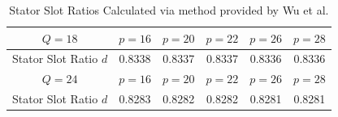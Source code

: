 \documentclass [a4 paper, 11pt, titlepage] {article}
\begin{document}
	\begin{table}[h]
		\begin{center}
			\begin{tabular}{c|c|c|c|c|c}
				$Q=18$ & $p=16$ & $p=20$ & $p=22$ & $p=26$ & $p=28$ \\
				\hline
				Stator Slot Ratio $d$ & 0.8338 & 0.8337 & 0.8337 & 0.8336 & 0.8336 \\
				\hline\hline
				$Q=24$ & $p=16$ & $p=20$ & $p=22$ & $p=26$ & $p=28$ \\
				\hline
				Stator Slot Ratio $d$ & 0.8283 & 0.8282 & 0.8282 & 0.8281 & 0.8281 \\
			\end{tabular}
		\end{center}
		\caption{Stator Slot Ratios Calculated via method provided by Wu et al. \cite{wu_optimal_2010}}
		\label{tab:resultingStatorSlotRatios}
	\end{table}
	
	
	
\end{document}
